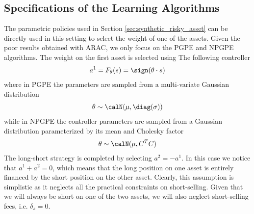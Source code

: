 \subsection{Specifications of the Learning Algorithms}
The parametric policies used in Section \ref{sec:synthetic_risky_asset} can be directly used in this setting to select the weight of one of the assets. Given the poor results obtained with ARAC, we only focus on the PGPE and NPGPE algorithms. The weight on the first asset is selected using The following controller 
\begin{equation*}
	a^1 = F_\theta(s) = \sign(\theta \cdot s)
\end{equation*}
where in PGPE the parameters are sampled from a multi-variate Gaussian distribution
\begin{equation*}
	\theta \sim \calN(\mu, \diag(\sigma))
\end{equation*}  
while in NPGPE the controller parameters are sampled from a Gaussian distribution parameterized by its mean and Cholesky factor
\begin{equation*}
	\theta \sim \calN(\mu, C^T C)
\end{equation*}  
The long-short strategy is completed by selecting $a^2 = - a^1$. In this case we notice that $a^1 + a^2 = 0$, which means that the long position on one asset is entirely financed by the short position on the other asset. Clearly, this assumption is simplistic as it neglects all the practical constraints on short-selling. Given that we will always be short on one of the two assets, we will also neglect short-selling fees, i.e. $\delta_s = 0$. 